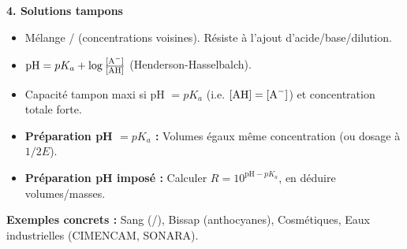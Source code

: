 \documentclass[11pt]{article}
\begin{document}
\begin{bilan}
\textbf{4. Solutions tampons}
\begin{itemize}
  \item Mélange / (concentrations voisines). Résiste à l'ajout d'acide/base/dilution.
  \item $\mathrm{pH} = pK_a + \log\frac{[\ce{A-}]}{[\ce{AH}]}$ (Henderson-Hasselbalch).
  \item Capacité tampon maxi si pH $= pK_a$ (i.e. $[\ce{AH}] = [\ce{A-}]$) et concentration totale forte.
  \item \textbf{Préparation pH $= pK_a$ :} Volumes égaux même concentration (ou dosage à $1/2E$).
  \item \textbf{Préparation pH imposé :} Calculer $R = 10^{\mathrm{pH}-pK_a}$, en déduire volumes/masses.
\end{itemize}

\textbf{Exemples concrets :} Sang (/), Bissap (anthocyanes), Cosmétiques, Eaux industrielles (CIMENCAM, SONARA).
\end{bilan}
\end{document}
